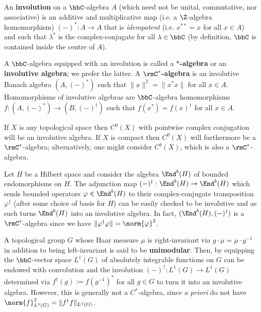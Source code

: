         \begin{definition} \label{def: involutions}
            An \textbf{involution} on a $\bbC$-algebra $A$ (which need not be unital, commutative, nor associative) is an additive and multiplicative map (i.e. a $\Z$-algebra homomorphism) $(-)^*: A \to A$ that is \textit{idempotent} (i.e. $x^{**} = x$ for all $x \in A$) and such that $\lambda^*$ is the complex-conjugate for all $\lambda \in \bbC$ (by definition, $\bbC$ is contained inside the centre of $A$).
            
            A $\bbC$-algebra equipped with an involution is called a \textbf{$*$-algebra} or an \textbf{involutive algebra}; we prefer the latter. A \textbf{$\rmC^*$-algebra} is an involutive Banach algebra $(A, (-)^*)$ such that $\|x\|^2 = \|x^* x\|$ for all $x \in A$. Homomorphisms of involutive algebras are $\bbC$-algebra homomorphisms $f: (A, (-)^*) \to (B, (-)^{\dagger})$ such that $f(x^*) = f(x)^{\dagger}$ for all $x \in A$.
        \end{definition}
        \begin{example} \label{example: continuous_functions_with_complex_conjugation}
            If $X$ is any topological space then $C^0(X)$ with pointwise complex conjugation will be an involutive algebra. If $X$ is compact then $C^0(X)$ will furthermore be a $\rmC^*$-algebra; alternatively, one might consider $C^b(X)$, which is also a $\rmC^*$-algebra.
        \end{example}
        \begin{example}
            Let $H$ be a Hilbert space and consider the algebra $\End^b(H)$ of bounded endomorphisms on $H$. The adjunction map $(-)^{\dagger}: \End^b(H) \to \End^b(H)$ which sends bounded operators $\varphi \in \End^b(H)$ to their complex-conjugate transposition $\varphi^{\dagger}$ (after some choice of basis for $H$) can be easily checked to be involutive and as such turns $\End^b(H)$ into an involutive algebra. In fact, $(\End^b(H), (-)^{\dagger})$ is a $\rmC^*$-algebra since we have $\|\varphi^{\dagger} \varphi\| = \norm{\varphi}^2$.
        \end{example}
        \begin{example} 
            A topological group $G$ whose Haar measure $\mu$ is right-invariant via $g \cdot \mu = \mu \cdot g^{-1}$ in addition to being left-invariant is said to be \textbf{unimodular}. Then, by equipping the $\bbC$-vector space $L^1(G)$ of absolutely integrable functions on $G$ can be endowed with convolution and the involution $(-)^{\dagger}: L^1(G) \to L^1(G)$ determined via $f^{\dagger}(g) := f(g^{-1})^*$ for all $g \in G$ to turn it into an involutive algebra. However, this is generally not a $C^*$-algebra, since \textit{a priori} do not have $\norm{f}_{L^1(G)}^2 = \|f^{\dagger} f\|_{L^1(G)}$.
        \end{example}
